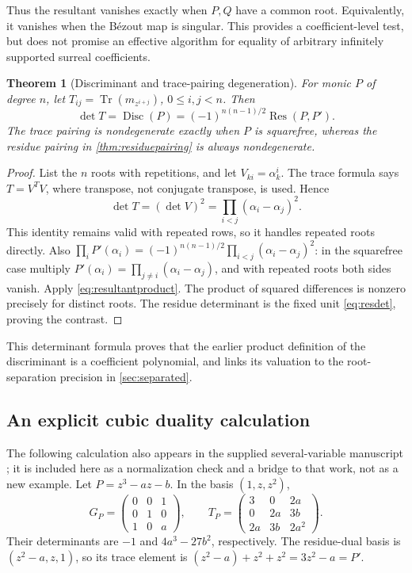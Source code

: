 \documentclass[11pt,letterpaper]{article}
\numberwithin{equation}{section}
\newtheorem{theorem}{Theorem}[section]
\theoremstyle{definition}
\theoremstyle{remark}\newtheorem{remark}[theorem]{Remark}
\newcommand{\Res}{\operatorname{Res}}
\newcommand{\Disc}{\operatorname{Disc}}
\newcommand{\Tr}{\operatorname{Tr}}
\begin{document}
Thus the resultant vanishes exactly when $P,Q$ have a common root.
Equivalently, it vanishes when the B\'ezout map is singular. This
provides a coefficient-level test, but does not promise an effective
algorithm for equality of arbitrary infinitely supported surreal
coefficients.

\begin{theorem}[Discriminant and trace-pairing degeneration]
\label{thm:discriminant}
For monic $P$ of degree $n$, let
$T_{ij}=\Tr(m_{z^{i+j}})$, $0\le i,j<n$. Then
\begin{equation}\label{eq:tracedisc}
 \det T=\Disc(P)
 =(-1)^{n(n-1)/2}\Res(P,P').
\end{equation}
The trace pairing is nondegenerate exactly when $P$ is squarefree,
whereas the residue pairing in \cref{thm:residuepairing} is always
nondegenerate.
\end{theorem}
\begin{proof}
List the $n$ roots with repetitions, and let $V_{ki}=\alpha_k^i$.
The trace formula says $T=V^TV$, where transpose, not conjugate
transpose, is used. Hence
\[
 \det T=(\det V)^2=\prod_{i<j}(\alpha_i-\alpha_j)^2.
\]
This identity remains valid with repeated rows, so it handles repeated
roots directly. Also
$\prod_iP'(\alpha_i)=(-1)^{n(n-1)/2}
\prod_{i<j}(\alpha_i-\alpha_j)^2$: in the squarefree case multiply
$P'(\alpha_i)=\prod_{j\ne i}(\alpha_i-\alpha_j)$, and with repeated
roots both sides vanish. Apply \eqref{eq:resultantproduct}.
The product of squared differences is nonzero precisely for distinct
roots. The residue determinant is the fixed unit
\eqref{eq:resdet}, proving the contrast.
\end{proof}
This determinant formula proves that the earlier product definition of
the discriminant is a coefficient polynomial, and links its valuation
to the root-separation precision in \cref{sec:separated}.

\subsection{An explicit cubic duality calculation}
The following calculation also appears in the supplied several-variable
manuscript \cite{SourceResearch}; it is included here as a normalization
check and a bridge to that work, not as a new example.
Let $P=z^3-az-b$. In the basis $(1,z,z^2)$,
\[
 G_P=\begin{pmatrix}0&0&1\\0&1&0\\1&0&a\end{pmatrix},\qquad
 T_P=\begin{pmatrix}3&0&2a\\0&2a&3b\\2a&3b&2a^2\end{pmatrix}.
\]
Their determinants are $-1$ and $4a^3-27b^2$, respectively. The
residue-dual basis is $(z^2-a,z,1)$, so its trace element is
$(z^2-a)+z^2+z^2=3z^2-a=P'$.
\end{document}
